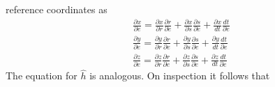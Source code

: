 \documentclass[11pt]{article}
\begin{document}
reference coordinates as
\begin{eqnarray}
  \frac{\partial x}{\partial e}=\frac{\partial x}{\partial r}\frac{\partial r}{\partial e} + \frac{\partial x}{\partial s}\frac{\partial s}{\partial e} + \frac{\partial x}{dt}\frac{dt}{\partial e} \\
  \frac{\partial y}{\partial e}=\frac{\partial y}{\partial r}\frac{\partial r}{\partial e} + \frac{\partial y}{\partial s}\frac{\partial s}{\partial e} + \frac{\partial y}{dt}\frac{dt}{\partial e} \\
  \frac{\partial z}{\partial e}=\frac{\partial z}{\partial r}\frac{\partial r}{\partial e} + \frac{\partial z}{\partial s}\frac{\partial s}{\partial e} + \frac{\partial z}{dt}\frac{dt}{\partial e} 
\end{eqnarray}
The equation for $\hat{h}$ is analogous. On inspection it follows that
\end{document}
